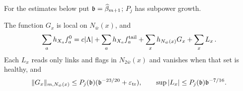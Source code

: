 For the estimates below put $\mathfrak b=\widehat{\beta}_{m+1}$; $P_j$ has subpower growth.
\begin{lemma}\label{lem:D-localization}
The function $G_x$ is local on $N_{\bar w}(x)$, and
\begin{equation*}
\sum_a h_{X_a}f_a^0
=c|\Lambda|+\sum_a h_{X_a}f_a^{\rm tail}
+\sum_xh_{N_{\bar w}(x)}G_x+\sum_xL_x\,.
\end{equation*}
Each $L_x$ reads only links and flags in $N_{2\bar w}(x)$ and vanishes when that set is healthy, and
\begin{equation*}
\|G_x\|_{m,N_{\bar w}(x)}\le P_j(\mathfrak b)(\mathfrak b^{-23/20}+\varepsilon_{\rm tr}),
\qquad \sup|L_x|\le P_j(\mathfrak b)\mathfrak b^{-7/16}.
\end{equation*}
\end{lemma}
